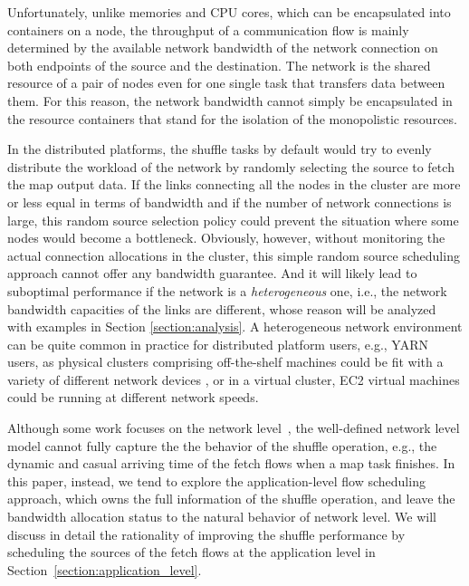 \documentclass[10pt,journal,compsoc]{IEEEtran}
\begin{document}
Unfortunately, unlike memories and CPU cores, which can be encapsulated into containers on a node, the throughput
of a communication flow is mainly determined by the available network bandwidth of 
the network connection on both endpoints of the source and the destination.  
The network is the shared resource of a pair of nodes even for one single task that transfers data between them. 
For this reason, the network bandwidth cannot simply be encapsulated in the resource containers that stand for the isolation of the monopolistic resources.

In the distributed platforms, the shuffle tasks by default
would try to evenly distribute the workload of the network
by randomly selecting the source to fetch the map output data. 
If the links connecting all the nodes in the cluster
are more or less equal in terms of bandwidth
and if the number of network connections is
large, this random source selection policy could prevent the situation
where some nodes would become a bottleneck.
Obviously, however, without monitoring the actual connection
allocations %
in the cluster, this simple random source scheduling approach cannot offer
any bandwidth guarantee. 
And it will likely lead to suboptimal performance
if the network is a \emph{heterogeneous} one,
i.e., the network bandwidth capacities of the links are different, 
whose reason will be analyzed with examples in Section \ref{section:analysis}.
A heterogeneous network environment can be quite common in practice
for distributed platform users, e.g., YARN users, as physical clusters comprising off-the-shelf
machines could be fit with a variety of different network devices \cite{zaharia2008improving}, 
or in a virtual cluster, EC2 virtual machines could be running at
different network speeds. %

Although some work focuses on the network level~\cite{shieh2011sharing,chowdhury2011managing,chowdhury2014efficient,chowdhury2015efficient}, 
the well-defined network level model cannot fully capture the the behavior of the shuffle operation, e.g., the dynamic and casual arriving time of the fetch flows
when a map task finishes. 
In this paper, instead, we tend to explore the application-level flow scheduling approach, 
which owns the full information of the shuffle operation, 
and leave the bandwidth allocation status to the natural behavior of network level. 
We will discuss in detail the rationality of improving the shuffle performance by scheduling the sources of the fetch flows at the application level in Section~\ref{section:application_level}.
\end{document}
